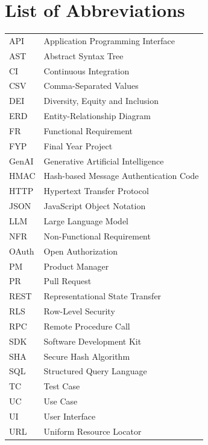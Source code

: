 \chapter*{List of Abbreviations}
\begin{longtable}{@{}>{\raggedright\arraybackslash}p{}>{\raggedright\arraybackslash}p{}@{}}
API & Application Programming Interface\\
AST & Abstract Syntax Tree\\
CI & Continuous Integration\\
CSV & Comma-Separated Values\\
DEI & Diversity, Equity and Inclusion\\
ERD & Entity-Relationship Diagram\\
FR & Functional Requirement\\
FYP & Final Year Project\\
GenAI & Generative Artificial Intelligence\\
HMAC & Hash-based Message Authentication Code\\
HTTP & Hypertext Transfer Protocol\\
JSON & JavaScript Object Notation\\
LLM & Large Language Model\\
NFR & Non-Functional Requirement\\
OAuth & Open Authorization\\
PM & Product Manager\\
PR & Pull Request\\
REST & Representational State Transfer\\
RLS & Row-Level Security\\
RPC & Remote Procedure Call\\
SDK & Software Development Kit\\
SHA & Secure Hash Algorithm\\
SQL & Structured Query Language\\
TC & Test Case\\
UC & Use Case\\
UI & User Interface\\
URL & Uniform Resource Locator\\
\end{longtable}
